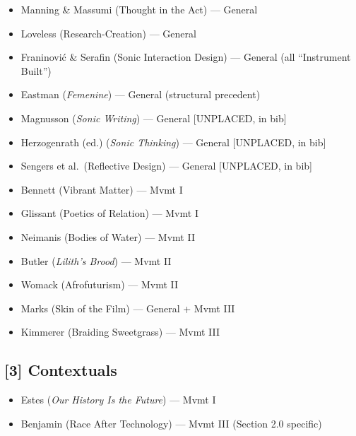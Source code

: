 \begin{itemize}[noitemsep]
    \item Manning \& Massumi (Thought in the Act) — General
    \item Loveless (Research-Creation) — General
    \item Franinović \& Serafin (Sonic Interaction Design) — General (all ``Instrument Built'')
    \item Eastman (\textit{Femenine}) — General (structural precedent)
    \item Magnusson (\textit{Sonic Writing}) — General [UNPLACED, in bib]
    \item Herzogenrath (ed.) (\textit{Sonic Thinking}) — General [UNPLACED, in bib]
    \item Sengers et al.\ (Reflective Design) — General [UNPLACED, in bib]
    \item Bennett (Vibrant Matter) — Mvmt I
    \item Glissant (Poetics of Relation) — Mvmt I
    \item Neimanis (Bodies of Water) — Mvmt II
    \item Butler (\textit{Lilith's Brood}) — Mvmt II
    \item Womack (Afrofuturism) — Mvmt II
    \item Marks (Skin of the Film) — General + Mvmt III
    \item Kimmerer (Braiding Sweetgrass) — Mvmt III
\end{itemize}

\subsection*{[3] Contextuals}

\begin{itemize}[noitemsep]
    \item Estes (\textit{Our History Is the Future}) — Mvmt I
    \item Benjamin (Race After Technology) — Mvmt III (Section 2.0 specific)
\end{itemize}

